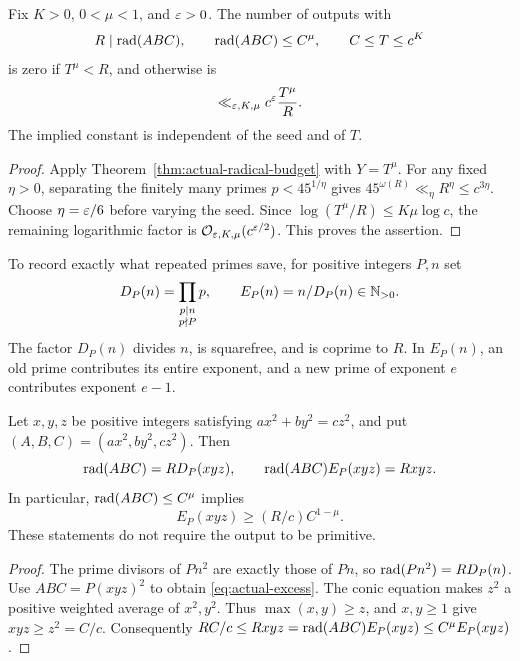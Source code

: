\begin{corollary}\label{cor:actual-radical-uniform}
Fix $K>0$, $0<\mu<1$, and $\varepsilon>0$. The number of outputs with
\[
 R\mid\operatorname{rad}(ABC),\qquad \operatorname{rad}(ABC)\le C^\mu,\qquad C\le T\le c^K
\]
is zero if $T^\mu<R$, and otherwise is
\begin{equation}\label{eq:actual-radical-seed-count}
 \ll_{\varepsilon,K,\mu} c^\varepsilon\frac{T^\mu}{R}.
\end{equation}
The implied constant is independent of the seed and of $T$.
\end{corollary}
\begin{proof}
Apply Theorem~\ref{thm:actual-radical-budget} with $Y=T^\mu$.
For any fixed $\eta>0$, separating the finitely many primes
$p<45^{1/\eta}$ gives
$45^{\omega(R)}\ll_\eta R^\eta\le c^{3\eta}$.
Choose $\eta=\varepsilon/6$ before varying the seed. Since
$\log(T^\mu/R)\le K\mu\log c$, the remaining logarithmic factor is
$\mathcal O_{\varepsilon,K,\mu}(c^{\varepsilon/2})$. This proves the assertion.
\end{proof}

To record exactly what repeated primes save, for positive integers $P,n$ set
\[
 D_P(n)=\prod_{\substack{p\mid n\\p\nmid P}}p,
 \qquad E_P(n)=n/D_P(n)\in\mathbb N_{>0}.
\]
The factor $D_P(n)$ divides $n$, is squarefree, and is coprime to $R$.
In $E_P(n)$, an old prime contributes its entire exponent, and a new
prime of exponent $e$ contributes exponent $e-1$.

\begin{proposition}\label{prop:actual-excess}
Let $x,y,z$ be positive integers satisfying $ax^2+by^2=cz^2$, and put
$(A,B,C)=(ax^2,by^2,cz^2)$. Then
\begin{equation}\label{eq:actual-excess}
 \operatorname{rad}(ABC)=R D_P(xyz),\qquad
 \operatorname{rad}(ABC)E_P(xyz)=Rxyz.
\end{equation}
In particular, $\operatorname{rad}(ABC)\le C^\mu$ implies
\begin{equation}\label{eq:actual-excess-necessary}
 E_P(xyz)\ge(R/c)C^{1-\mu}.
\end{equation}
These statements do not require the output to be primitive.
\end{proposition}
\begin{proof}
The prime divisors of $Pn^2$ are exactly those of $Pn$, so
$\operatorname{rad}(Pn^2)=R D_P(n)$. Use $ABC=P(xyz)^2$ to obtain
\eqref{eq:actual-excess}. The conic equation makes $z^2$ a positive
weighted average of $x^2,y^2$. Thus $\max(x,y)\ge z$, and $x,y\ge1$
give $xyz\ge z^2=C/c$. Consequently
$RC/c\le Rxyz=\operatorname{rad}(ABC)E_P(xyz)\le C^\mu E_P(xyz)$.
\end{proof}

